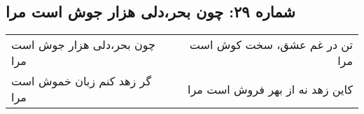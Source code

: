 \begin{center}
\section*{شماره ۲۹: چون بحر،‌دلی هزار جوش است مرا}
\label{sec:029}
\begin{longtable}{l p{0.5cm} r}
چون بحر،‌دلی هزار جوش است مرا
&&
تن در غم عشق، سخت کوش است مرا
\\
گر زهد کنم زبان خموش است مرا
&&
کاین زهد نه از بهر فروش است مرا
\\
\end{longtable}
\end{center}
